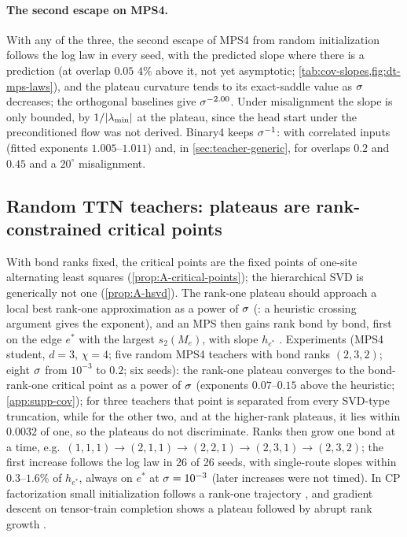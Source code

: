 \paragraph{The second escape on MPS4.}
\empirical{}  With any of the three, the second escape of
MPS4 from random initialization follows the log law in every seed, with the predicted slope where there is a
prediction (at overlap $0.05$ $4\%$ above it, not yet asymptotic; \cref{tab:cov-slopes,fig:dt-mps-laws}), and
the plateau curvature tends to its exact-saddle value as $\sigma$ decreases; the orthogonal baselines give
$\sigma^{-2.00}$. Under misalignment the slope is only bounded, by $1/\lvert\lambda_{\min}\rvert$ at the plateau, since
the head start under the preconditioned flow was not derived. Binary4 keeps $\sigma^{-1}$: with
correlated inputs (fitted exponents $1.005$--$1.011$) and, in \cref{sec:teacher-generic}, for overlaps $0.2$ and
$0.45$ and a $20^\circ$ misalignment.

\subsection{Random TTN teachers: plateaus are rank-constrained critical points}\label{sec:teacher-ttn}

With bond ranks fixed, the critical points are the fixed points of one-site alternating least squares
\proven{} 
(\cref{prop:A-critical-points}); the hierarchical SVD is generically not one \proven{} (\cref{prop:A-hsvd}). The
rank-one plateau should approach a local best rank-one approximation as a power of $\sigma$ (\conjecture: a
heuristic crossing argument gives the exponent), and an MPS then gains rank bond by bond, first on the edge
$e^*$ with the largest $s_2(M_e)$, with slope $h_{e^*}$ \derived. Experiments \empirical{} \newresult{} (MPS4
student, $d=3$, $\chi=4$; five random MPS4 teachers with bond ranks $(2,3,2)$; eight $\sigma$ from $10^{-3}$ to
$0.2$; six seeds): the rank-one plateau converges to the bond-rank-one critical point as a power of $\sigma$
(exponents $0.07$--$0.15$ above the heuristic; \cref{app:supp-cov}); for three teachers that point is separated
from every SVD-type truncation, while for the other two, and at the higher-rank plateaus, it lies within
$0.0032$ of one, so the plateaus do not discriminate. Ranks then grow one bond at a time, e.g.\
$(1,1,1)\to(2,1,1)\to(2,2,1)\to(2,3,1)\to(2,3,2)$; the first increase follows the log law in 26 of 26 seeds, with
single-route slopes within $0.3$--$1.6\%$ of $h_{e^*}$, always on $e^*$ at $\sigma=10^{-3}$ (later increases were not
timed). In CP factorization small initialization follows a rank-one trajectory
\citep{razin2021implicit}, and gradient descent on tensor-train completion shows a plateau followed by
abrupt rank growth \citep{milanesi2021implicit}.

